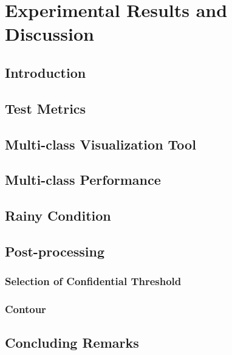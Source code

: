 
\chapter{Experimental Results and Discussion}
\label{cha:experiments}
\begin{spacing}{1.5}
\setlength{\parskip}{0.3in}

\section{Introduction}

\section{Test Metrics}

\section{Multi-class Visualization Tool}

\section{Multi-class Performance}

\section{Rainy Condition}

\section{Post-processing}

\subsection{Selection of Confidential Threshold}

\subsection{Contour}

\section{Concluding Remarks}

\end{spacing}
\newpage
